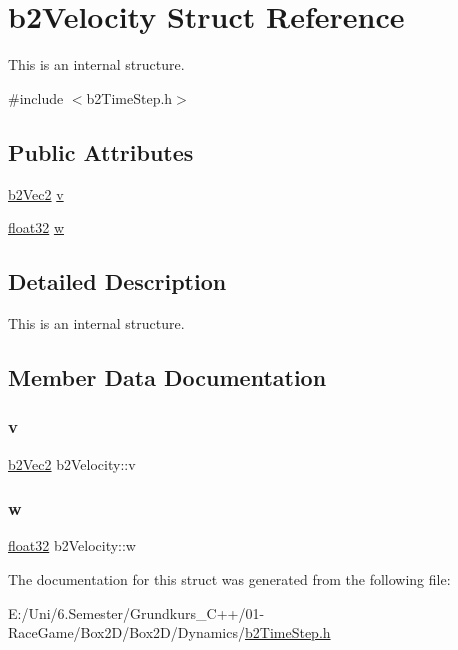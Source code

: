 \hypertarget{structb2_velocity}{}\section{b2\+Velocity Struct Reference}
\label{structb2_velocity}


This is an internal structure.  




{\ttfamily \#include $<$b2\+Time\+Step.\+h$>$}

\subsection*{Public Attributes}
\begin{DoxyCompactItemize}
\item 
\mbox{\hyperlink{structb2_vec2}{b2\+Vec2}} \mbox{\hyperlink{structb2_velocity_a73b92ceff532491e71b9dbc53eecaa70}{v}}
\item 
\mbox{\hyperlink{b2_settings_8h_aacdc525d6f7bddb3ae95d5c311bd06a1}{float32}} \mbox{\hyperlink{structb2_velocity_a6ce6f6c83ceb95100532d3f2b0485b83}{w}}
\end{DoxyCompactItemize}


\subsection{Detailed Description}
This is an internal structure. 

\subsection{Member Data Documentation}
\mbox{\label{structb2_velocity_a73b92ceff532491e71b9dbc53eecaa70}} 
\subsubsection{\texorpdfstring{v}{v}}
{\footnotesize\ttfamily \mbox{\hyperlink{structb2_vec2}{b2\+Vec2}} b2\+Velocity\+::v}

\mbox{\label{structb2_velocity_a6ce6f6c83ceb95100532d3f2b0485b83}} 
\subsubsection{\texorpdfstring{w}{w}}
{\footnotesize\ttfamily \mbox{\hyperlink{b2_settings_8h_aacdc525d6f7bddb3ae95d5c311bd06a1}{float32}} b2\+Velocity\+::w}



The documentation for this struct was generated from the following file\+:\begin{DoxyCompactItemize}
\item 
E\+:/\+Uni/6.\+Semester/\+Grundkurs\+\_\+\+C++/01-\/\+Race\+Game/\+Box2\+D/\+Box2\+D/\+Dynamics/\mbox{\hyperlink{b2_time_step_8h}{b2\+Time\+Step.\+h}}\end{DoxyCompactItemize}
